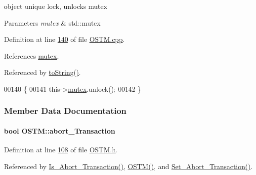 object unique lock, unlocks mutex 


\begin{DoxyParams}{Parameters}
{\em mutex} & std\+::mutex \\
\hline
\end{DoxyParams}


Definition at line \hyperlink{_o_s_t_m_8cpp_source_l00140}{140} of file \hyperlink{_o_s_t_m_8cpp_source}{O\+S\+T\+M.\+cpp}.



References \hyperlink{_o_s_t_m_8h_source_l00120}{mutex}.



Referenced by \hyperlink{_o_s_t_m_8h_source_l00042}{to\+String()}.


\begin{DoxyCode}
00140                         \{
00141     this->\hyperlink{class_o_s_t_m_aaab0921fd1564b793f882a5002ec7106_aaab0921fd1564b793f882a5002ec7106}{mutex}.unlock();
00142 \}
\end{DoxyCode}


\subsubsection{Member Data Documentation}
\paragraph[{\texorpdfstring{abort\+\_\+\+Transaction}{abort_Transaction}}]{\setlength{\rightskip}{0pt plus 5cm}bool O\+S\+T\+M\+::abort\+\_\+\+Transaction\hspace{0.3cm}{\ttfamily [private]}}\hypertarget{class_o_s_t_m_a5121d9c4b08320b26beca82ba2f85c4a_a5121d9c4b08320b26beca82ba2f85c4a}{}\label{class_o_s_t_m_a5121d9c4b08320b26beca82ba2f85c4a_a5121d9c4b08320b26beca82ba2f85c4a}


Definition at line \hyperlink{_o_s_t_m_8h_source_l00108}{108} of file \hyperlink{_o_s_t_m_8h_source}{O\+S\+T\+M.\+h}.



Referenced by \hyperlink{_o_s_t_m_8cpp_source_l00126}{Is\+\_\+\+Abort\+\_\+\+Transaction()}, \hyperlink{_o_s_t_m_8cpp_source_l00020}{O\+S\+T\+M()}, and \hyperlink{_o_s_t_m_8cpp_source_l00119}{Set\+\_\+\+Abort\+\_\+\+Transaction()}.

